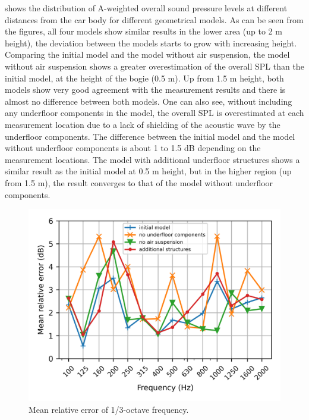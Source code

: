  shows the distribution of  A-weighted overall sound pressure levels at different distances from the car body for different geometrical models.%
As can be seen from the figures, all four models show similar results in the lower area (up to 2 m height), the deviation between the models starts to grow with increasing height. Comparing the initial model and the model without air suspension, the model without air suspension shows a greater overestimation of the overall SPL than the initial model, at the height of the bogie (0.5 m). Up from 1.5 m height, both models show very good agreement with the measurement results and there is almost no difference between both models. One can also see, without including any underfloor components in the model, the overall SPL is overestimated at each measurement location due to a lack of shielding of the acoustic wave by the underfloor components. The difference between the initial model and the model without underfloor components is about 1 to 1.5 dB depending on the measurement locations. The model with additional underfloor structures shows a similar result as the initial model at 0.5 m height, but in the higher region (up from 1.5 m), the result converges to that of the model without underfloor components.

\begin{figure}[H]
	\centering
	\includegraphics[width=0.7\linewidth]{fig/chap5/geometry_variation/freq_spectrum/average_gap.png}
	\caption{Mean relative error of 1/3-octave frequency.}
	\label{fig:gap_freq_spectrum_geometry}
\end{figure}

